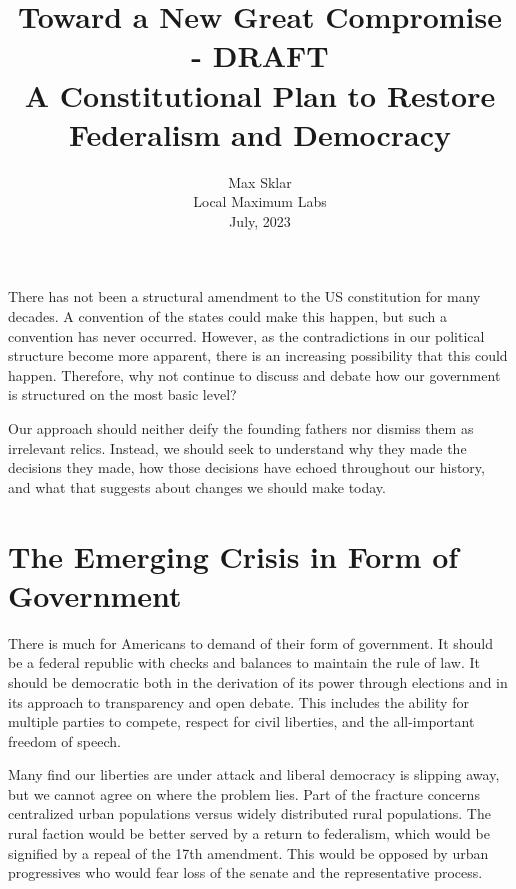 \documentclass{article}
\begin{document}
\parindent=0in
\parskip=12pt

\title{
  Toward a New Great Compromise - DRAFT\\
  \large{
    A Constitutional Plan to Restore Federalism and Democracy
  }
}

\author{Max Sklar\\ Local Maximum Labs \\ July, 2023}
\date{}

\maketitle
\thispagestyle{empty}

There has not been a structural amendment to the US constitution for many decades. A convention of the states could make this happen, but such a convention has never occurred. However, as the contradictions in our political structure become more apparent, there is an increasing possibility that this could happen. Therefore, why not continue to discuss and debate how our government is structured on the most basic level?

Our approach should neither deify the founding fathers nor dismiss them as irrelevant relics. Instead, we should seek to understand why they made the decisions they made, how those decisions have echoed throughout our history, and what that suggests about changes we should make today.

\section{The Emerging Crisis in Form of Government}

There is much for Americans to demand of their form of government. It should be a federal republic with checks and balances to maintain the rule of law. It should be democratic both in the derivation of its power through elections and in its approach to transparency and open debate. This includes the ability for multiple parties to compete, respect for civil liberties, and the all-important freedom of speech.

Many find our liberties are under attack and liberal democracy is slipping away, but we cannot agree on where the problem lies. Part of the fracture concerns centralized urban populations versus widely distributed rural populations. The rural faction would be better served by a return to federalism, which would be signified by a repeal of the 17th amendment\cite{Tucker}\cite{Virginia}. This would be opposed by urban progressives who would fear loss of the senate and the representative process.
\end{document}
